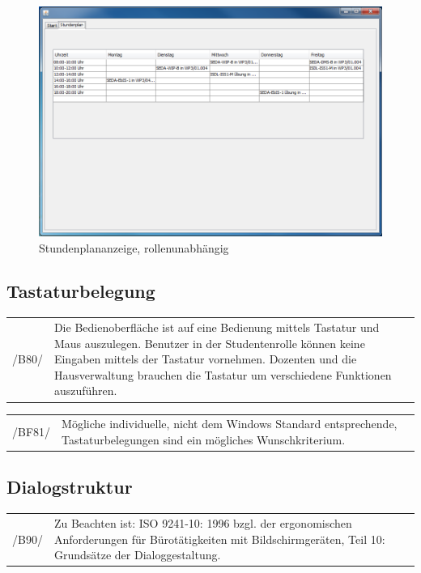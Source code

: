 \begin{figure}[H]
\begin{center}
\includegraphics[width=120mm]{images/section_7/HauptseiteAlleStundenplan.PNG}
\caption{Stundenplananzeige, rollenunabhängig}
\label{img:stundenplanAlle}
\end{center}
\end{figure}
 
\subsection{Tastaturbelegung}

\begin{tabular}{p{1.5cm}p{14.5cm}}
 /B80/	& Die Bedienoberfläche ist auf eine Bedienung mittels Tastatur und Maus auszulegen. Benutzer in der Studentenrolle können keine Eingaben mittels der Tastatur vornehmen. Dozenten und die Hausverwaltung brauchen die Tastatur um verschiedene Funktionen auszuführen. \\[0.25cm]	 
\end{tabular}

\begin{tabular}{p{1.5cm}p{14.5cm}}
 /BF81/	& Mögliche individuelle, nicht dem Windows Standard entsprechende, Tastaturbelegungen sind ein mögliches  Wunschkriterium. \\[0.25cm]	 
\end{tabular}


\subsection{Dialogstruktur}

\begin{tabular}{p{1.5cm}p{14.5cm}}
 /B90/	& Zu Beachten ist: ISO 9241-10: 1996 bzgl. der ergonomischen Anforderungen für Bürotätigkeiten mit Bildschirmgeräten, Teil 10: Grundsätze der Dialoggestaltung. \\[0.25cm]	 
\end{tabular}

